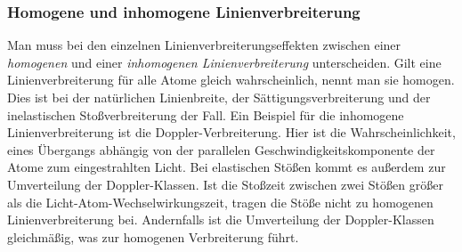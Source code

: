 \subsubsection{Homogene und inhomogene
Linienverbreiterung}\label{subsubsec:homogene_inhomogene_verbreiterung}
Man muss bei den einzelnen Linienverbreiterungseffekten zwischen einer
\textit{homogenen} und einer \textit{inhomogenen Linienverbreiterung}
unterscheiden. Gilt eine Linienverbreiterung für alle Atome gleich
wahrscheinlich, nennt man sie homogen. Dies ist bei der natürlichen
Linienbreite, der Sättigungsverbreiterung und der inelastischen
Stoßverbreiterung der Fall. Ein Beispiel für die inhomogene Linienverbreiterung
ist die Doppler-Verbreiterung. Hier ist die Wahrscheinlichkeit, eines Übergangs
abhängig von der parallelen Geschwindigkeitskomponente der Atome zum
eingestrahlten Licht. Bei elastischen Stößen kommt es außerdem zur Umverteilung
der Doppler-Klassen. Ist die Stoßzeit zwischen zwei Stößen größer als die
Licht-Atom-Wechselwirkungszeit, tragen die Stöße nicht zu homogenen
Linienverbreiterung bei. Andernfalls ist die Umverteilung der Doppler-Klassen
gleichmäßig, was zur homogenen Verbreiterung führt.

